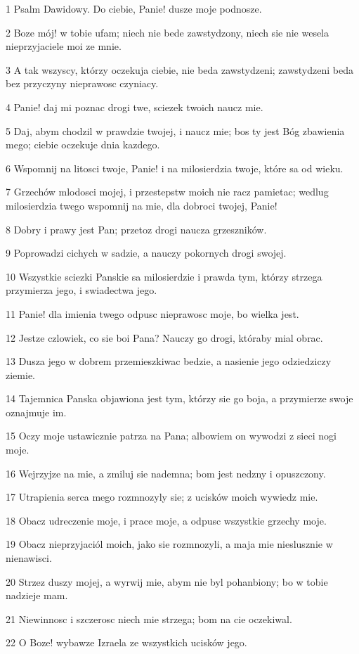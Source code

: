 \par 1 Psalm Dawidowy. Do ciebie, Panie! dusze moje podnosze.
\par 2 Boze mój! w tobie ufam; niech nie bede zawstydzony, niech sie nie wesela nieprzyjaciele moi ze mnie.
\par 3 A tak wszyscy, którzy oczekuja ciebie, nie beda zawstydzeni; zawstydzeni beda bez przyczyny nieprawosc czyniacy.
\par 4 Panie! daj mi poznac drogi twe, sciezek twoich naucz mie.
\par 5 Daj, abym chodzil w prawdzie twojej, i naucz mie; bos ty jest Bóg zbawienia mego; ciebie oczekuje dnia kazdego.
\par 6 Wspomnij na litosci twoje, Panie! i na milosierdzia twoje, które sa od wieku.
\par 7 Grzechów mlodosci mojej, i przestepstw moich nie racz pamietac; wedlug milosierdzia twego wspomnij na mie, dla dobroci twojej, Panie!
\par 8 Dobry i prawy jest Pan; przetoz drogi naucza grzeszników.
\par 9 Poprowadzi cichych w sadzie, a nauczy pokornych drogi swojej.
\par 10 Wszystkie sciezki Panskie sa milosierdzie i prawda tym, którzy strzega przymierza jego, i swiadectwa jego.
\par 11 Panie! dla imienia twego odpusc nieprawosc moje, bo wielka jest.
\par 12 Jestze czlowiek, co sie boi Pana? Nauczy go drogi, któraby mial obrac.
\par 13 Dusza jego w dobrem przemieszkiwac bedzie, a nasienie jego odziedziczy ziemie.
\par 14 Tajemnica Panska objawiona jest tym, którzy sie go boja, a przymierze swoje oznajmuje im.
\par 15 Oczy moje ustawicznie patrza na Pana; albowiem on wywodzi z sieci nogi moje.
\par 16 Wejrzyjze na mie, a zmiluj sie nademna; bom jest nedzny i opuszczony.
\par 17 Utrapienia serca mego rozmnozyly sie; z ucisków moich wywiedz mie.
\par 18 Obacz udreczenie moje, i prace moje, a odpusc wszystkie grzechy moje.
\par 19 Obacz nieprzyjaciól moich, jako sie rozmnozyli, a maja mie nieslusznie w nienawisci.
\par 20 Strzez duszy mojej, a wyrwij mie, abym nie byl pohanbiony; bo w tobie nadzieje mam.
\par 21 Niewinnosc i szczerosc niech mie strzega; bom na cie oczekiwal.
\par 22 O Boze! wybawze Izraela ze wszystkich ucisków jego.

